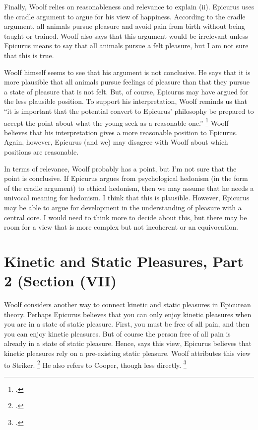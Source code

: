 \documentclass[12pt,letterpaper]{article}
\begin{document}
Finally, Woolf relies on reasonableness and relevance to explain (ii).
Epicurus uses the cradle argument to argue for his view of happiness.
According to the cradle argument, all animals pursue pleasure and avoid pain from birth without being taught or trained.
Woolf also says that this argument would be irrelevant unless Epicurus means to say that all animals pursue a felt pleasure, but I am not sure that this is true.

Woolf himself seems to see that his argument is not conclusive.
He says that it is more plausible that all animals pursue feelings of pleasure than that they pursue a state of pleasure that is not felt.
But, of course, Epicurus may have argued for the less plausible position.
To support his interpretation, Woolf reminds us that ``it is important that the potential convert to Epicurus' philosophy be prepared to accept the point about what the young seek as a reasonable one.''
\footcite[][175]{pleasure-and-desire-woolf-2009}
Woolf believes that his interpretation gives a more reasonable position to Epicurus.
Again, however, Epicurus (and we) may disagree with Woolf about which positions are reasonable.

In terms of relevance, Woolf probably has a point, but I'm not sure that the point is conclusive.
If Epicurus argues from psychological hedonism (in the form of the cradle argument) to ethical hedonism, then we may assume that he needs a univocal meaning for hedonism.
I think that this is plausible.
However, Epicurus may be able to argue for development in the understanding of pleasure with a central core.
I would need to think more to decide about this, but there may be room for a view that is more complex but not incoherent or an equivocation.

\section*{Kinetic and Static Pleasures, Part 2 (Section (VII)}

Woolf considers another way to connect kinetic and static pleasures in Epicurean theory.
Perhaps Epicurus believes that you can only enjoy kinetic pleasures when you are in a state of static pleasure.
First, you must be free of all pain, and then you can enjoy kinetic pleasures.
But of course the person free of all pain is already in a state of static pleasure.
Hence, says this view, Epicurus believes that kinetic pleasures rely on a pre-existing static pleasure.
Woolf attributes this view to Striker.%
\footcite{epicurean-hedonism-striker-1996}
He also refers to Cooper, though less directly.%
\footcite{pleasure-and-desire-in-epicurus-cooper-1999}
\end{document}
